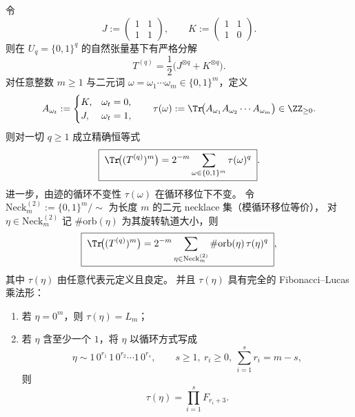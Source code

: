 \begin{conclusion}\label{con:xi-terminal-replica-softcore-binary-necklace-trace-formula}
令
\[
J:=\begin{pmatrix}1&1\\[2pt]1&1\end{pmatrix},
\qquad
K:=\begin{pmatrix}1&1\\[2pt]1&0\end{pmatrix}.
\]
则在 \(U_q=\{0,1\}^q\) 的自然张量基下有严格分解
\[
T^{(q)}=\frac12\bigl(J^{\otimes q}+K^{\otimes q}\bigr).
\]
对任意整数 \(m\ge 1\) 与二元词 \(\omega=\omega_1\cdots\omega_m\in\{0,1\}^m\)，定义
\[
A_{\omega_t}:=\begin{cases}K,&\omega_t=0,\\ J,&\omega_t=1,\end{cases}
\qquad
\tau(\omega):=\Tr\!\bigl(A_{\omega_1}A_{\omega_2}\cdots A_{\omega_m}\bigr)\in\ZZ_{\ge 0}.
\]
则对一切 \(q\ge 1\) 成立精确恒等式
\[
\boxed{\;
\Tr\!\bigl((T^{(q)})^{m}\bigr)=2^{-m}\sum_{\omega\in\{0,1\}^m}\tau(\omega)^{q}\; }.
\]
进一步，由迹的循环不变性 \(\tau(\omega)\) 在循环移位下不变。
令 \(\mathrm{Neck}_m^{(2)}:=\{0,1\}^m/\!\sim\) 为长度 \(m\) 的二元 necklace 集（模循环移位等价），
对 \(\eta\in \mathrm{Neck}_m^{(2)}\) 记 \(\#\mathrm{orb}(\eta)\) 为其旋转轨道大小，则
\[
\boxed{\;
\Tr\!\bigl((T^{(q)})^{m}\bigr)=2^{-m}\sum_{\eta\in \mathrm{Neck}_m^{(2)}}\#\mathrm{orb}(\eta)\,\tau(\eta)^{q}\; } ,
\]
其中 \(\tau(\eta)\) 由任意代表元定义且良定。
并且 \(\tau(\eta)\) 具有完全的 Fibonacci--Lucas 乘法形：
\begin{enumerate}
  \item 若 \(\eta=0^m\)，则 \(\tau(\eta)=L_m\)；
  \item 若 \(\eta\) 含至少一个 \(1\)，将 \(\eta\) 以循环方式写成
  \[
  \eta\sim 1\,0^{r_1}\,1\,0^{r_2}\cdots 1\,0^{r_s},
  \qquad
  s\ge 1,\ r_i\ge 0,\ \sum_{i=1}^s r_i=m-s,
  \]
  则
  \[
  \tau(\eta)=\prod_{i=1}^{s}F_{r_i+3}.
  \]
\end{enumerate}
\end{conclusion}
